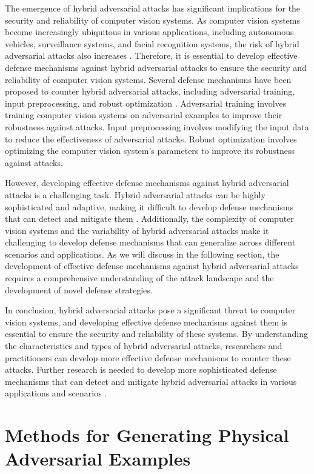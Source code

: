 \documentclass[11pt]{article}
\begin{document}
The emergence of hybrid adversarial attacks has significant implications for the security and reliability of computer vision systems. As computer vision systems become increasingly ubiquitous in various applications, including autonomous vehicles, surveillance systems, and facial recognition systems, the risk of hybrid adversarial attacks also increases \cite{ref4}. Therefore, it is essential to develop effective defense mechanisms against hybrid adversarial attacks to ensure the security and reliability of computer vision systems. Several defense mechanisms have been proposed to counter hybrid adversarial attacks, including adversarial training, input preprocessing, and robust optimization \cite{ref34}. Adversarial training involves training computer vision systems on adversarial examples to improve their robustness against attacks. Input preprocessing involves modifying the input data to reduce the effectiveness of adversarial attacks. Robust optimization involves optimizing the computer vision system's parameters to improve its robustness against attacks.

However, developing effective defense mechanisms against hybrid adversarial attacks is a challenging task. Hybrid adversarial attacks can be highly sophisticated and adaptive, making it difficult to develop defense mechanisms that can detect and mitigate them \cite{ref7}. Additionally, the complexity of computer vision systems and the variability of hybrid adversarial attacks make it challenging to develop defense mechanisms that can generalize across different scenarios and applications. As we will discuss in the following section, the development of effective defense mechanisms against hybrid adversarial attacks requires a comprehensive understanding of the attack landscape and the development of novel defense strategies.

In conclusion, hybrid adversarial attacks pose a significant threat to computer vision systems, and developing effective defense mechanisms against them is essential to ensure the security and reliability of these systems. By understanding the characteristics and types of hybrid adversarial attacks, researchers and practitioners can develop more effective defense mechanisms to counter these attacks. Further research is needed to develop more sophisticated defense mechanisms that can detect and mitigate hybrid adversarial attacks in various applications and scenarios \cite{ref37}.

\section{Methods for Generating Physical Adversarial Examples}
\end{document}
